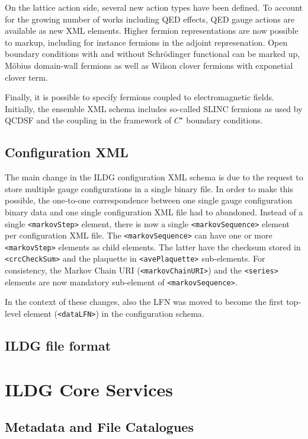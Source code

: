 \documentclass[a4paper,11pt]{article} \usepackage{pos} \usepackage{subcaption}
\begin{document}
On the lattice action side, several new action types have been
defined. To account for the growing number of works including QED
effects, QED gauge actions are available as new XML elements.
Higher fermion representations are now
possible to markup, including for instance fermions in the adjoint
represenation. Open boundary conditions with and without Schrödinger
functional can be marked up, Möbius domain-wall fermions as well as
Wilson clover fermions with exponetial clover term.

Finally, it is possible to specify fermions coupled to electromagnetic
fields. Initially, the ensemble XML schema includes so-called SLINC
fermions as used by QCDSF and the coupling in the framework of
$C^\star$ boundary conditions.

\subsection{Configuration XML}

The main change in the ILDG configuration XML schema is due to the
request to store multiple gauge configurations in a single binary
file. In order to make this possible, the one-to-one correspondence
between one single gauge configuration binary data and one single
configuration XML file had to abandoned. Instead of a single
\texttt{<markovStep>} element, there is 
now a single \texttt{<markovSequence>} element per configuration XML
file. The \texttt{<markovSequence>} can have one or more
\texttt{<markovStep>} elements as child elements. The latter have the
checksum stored in \texttt{<crcCheckSum>} and the plaquette in
\texttt{<avePlaquette>} sub-elements. For consistency, the Markov
Chain URI (\texttt{<markovChainURI>}) and the \texttt{<series>}
elements are now mandatory sub-element of \texttt{<markovSequence>}. 

In the context of these changes, also the LFN was moved to become the
first top-level element (\texttt{<dataLFN>}) in the configuration schema.

\subsection{ILDG file format}

\section{ILDG Core Services}

\subsection{Metadata and File Catalogues}
\end{document}
